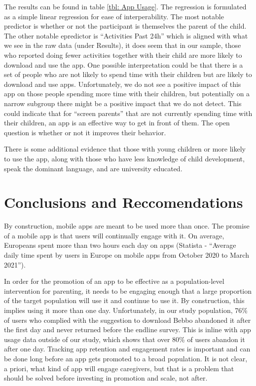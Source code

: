 \documentclass{article}
\begin{document}
The results can be found in table \ref{tbl: App Usage}. The regression is formulated as a simple linear regression for ease of interperability. The most notable predictor is whether or not the participant is themselves the parent of the child. The other notable epredictor is ``Activities Past 24h'' which is aligned with what we see in the raw data (under Results), it does seem that in our sample, those who reported doing fewer activities together with their child are more likely to download and use the app. One possible interpretation could be that there is a set of people who are not likely to spend time with their children but are likely to download and use apps. Unfortunately, we do not see a positive impact of this app on those people spending more time with their children, but potentially on a narrow subgroup there might be a positive impact that we do not detect. This could indicate that for ``screen parents'' that are not currently spending time with their children, an app is an effective way to get in front of them. The open question is whether or not it improves their behavior.

There is some additional evidence that those with young children or more likely to use the app, along with those who have less knowledge of child development, speak the dominant language, and are university educated.



\section{Conclusions and Reccomendations}

By construction, mobile apps are meant to be used more than once. The promise of a mobile app is that users will continually engage with it. On average, Europeans spent more than two hours each day on apps (Statista - ``Average daily time spent by users in Europe on mobile apps from October 2020 to March 2021'').

In order for the promotion of an app to be effective as a population-level intervention for parenting, it needs to be engaging enough that a large proportion of the target population will use it and continue to use it. By construction, this implies using it more than one day. Unfortunately, in our study population, 76\% of users who complied with the suggestion to download Bebbo abandoned it after the first day and never returned before the endline survey. This is inline with app usage data outside of our study, which shows that over 80\% of users abandon it after one day. Tracking app retention and engagement rates is important and can be done long before an app gets promoted to a broad population. It is not clear, a priori, what kind of app will engage caregivers, but that is a problem that should be solved before investing in promotion and scale, not after.
\end{document}

